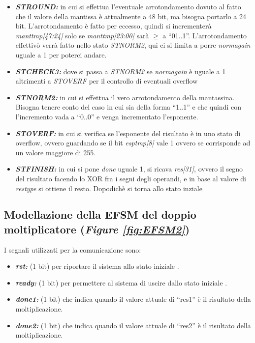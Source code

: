 \documentclass[]{IEEEtran}
\begin{document}
\begin{itemize}
\item {\it\bf ST\textunderscore ROUND:} in cui si effettua l'eventuale arrotondamento dovuto al fatto che il valore della mantissa è attualmente a 48 bit, ma bisogna portarlo a 24 bit. L'arrotondamento è fatto per eccesso, quindi si incrementerà {\it mant\textunderscore tmp[47:24]} solo se {\it mant\textunderscore tmp[23:00]} sarà \( \geq \) a ``01..1''. L'arrotondamento effettivò verrà fatto nello stato {\it ST\textunderscore NORM2}, qui ci si limita a porre {\it norm\textunderscore again} uguale a 1 per poterci andare.
\item {\it\bf ST\textunderscore CHECK3:} dove si passa a {\it ST\textunderscore NORM2} se {\it norm\textunderscore again} è uguale a 1 altrimenti a {\it ST\textunderscore OVERF} per il controllo di eventuali overflow
\item {\it\bf ST\textunderscore NORM2:} in cui si effettua il vero arrotondamento della mantassina. Bisogna tenere conto del caso in cui sia della forma ``1..1'' e che quindi con l'incremento vada a ``0..0'' e  venga incrementato l'esponente.
\item {\it\bf ST\textunderscore OVERF:} in cui si verifica se l'esponente del risultato è in uno stato di overflow, ovvero guardando se il bit {\it esp\textunderscore tmp[8]} vale 1 ovvero se corrisponde ad un valore maggiore di 255.
\item {\it\bf ST\textunderscore FINISH:} in cui si pone {\it done} uguale 1, si ricava {\it res[31]}, ovvero il segno del risultato facendo lo XOR fra i segni degli operandi, e in base al valore di {\it res\textunderscore type} si ottiene il resto. Dopodichè si torna allo stato inziale
\end{itemize}


\subsection{Modellazione della EFSM del doppio moltiplicatore ({\it Figure \ref{fig:EFSM2}})}
I segnali utilizzati per la comunicazione sono:
\begin{itemize}
\item {\it\bf rst:} (1 bit) per riportare il sistema allo stato iniziale .
\item {\it\bf ready:} (1 bit) per permettere al sistema di uscire dallo stato iniziale .
\item {\it\bf done1:} (1 bit) che indica quando il valore attuale di ``res1'' è il risultato della moltiplicazione.
\item {\it\bf done2:} (1 bit) che indica quando il valore attuale di ``res2'' è il risultato della moltiplicazione.
\end{itemize}
\end{document}
